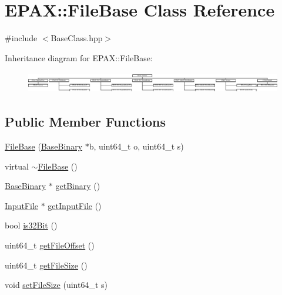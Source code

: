 \hypertarget{class_e_p_a_x_1_1_file_base}{\section{\-E\-P\-A\-X\-:\-:\-File\-Base \-Class \-Reference}
\label{class_e_p_a_x_1_1_file_base}
}


{\ttfamily \#include $<$\-Base\-Class.\-hpp$>$}

\-Inheritance diagram for \-E\-P\-A\-X\-:\-:\-File\-Base\-:\begin{figure}[H]
\begin{center}
\leavevmode
\includegraphics[height=0.952381cm]{class_e_p_a_x_1_1_file_base}
\end{center}
\end{figure}
\subsection*{\-Public \-Member \-Functions}
\begin{DoxyCompactItemize}
\item 
\hyperlink{class_e_p_a_x_1_1_file_base_a9f38ebc8164735bee43367806d76630d}{\-File\-Base} (\hyperlink{class_e_p_a_x_1_1_base_binary}{\-Base\-Binary} $\ast$b, uint64\-\_\-t o, uint64\-\_\-t s)
\item 
virtual \hyperlink{class_e_p_a_x_1_1_file_base_abf99ce91ed574b549d53a1ba43f931ba}{$\sim$\-File\-Base} ()
\item 
\hyperlink{class_e_p_a_x_1_1_base_binary}{\-Base\-Binary} $\ast$ \hyperlink{class_e_p_a_x_1_1_file_base_a2b31d9b96a82c8702aa2e20017039fd4}{get\-Binary} ()
\item 
\hyperlink{class_e_p_a_x_1_1_input_file}{\-Input\-File} $\ast$ \hyperlink{class_e_p_a_x_1_1_file_base_a996b93e64d317be72461c20089a1e91a}{get\-Input\-File} ()
\item 
bool \hyperlink{class_e_p_a_x_1_1_file_base_ab5c2b2dfb21a45a07121d3c0f7942e8b}{is32\-Bit} ()
\item 
uint64\-\_\-t \hyperlink{class_e_p_a_x_1_1_file_base_a779f2254eef1279f52f372e18bfb75f7}{get\-File\-Offset} ()
\item 
uint64\-\_\-t \hyperlink{class_e_p_a_x_1_1_file_base_a41637ea5355a70fee2467f279964e064}{get\-File\-Size} ()
\item 
void \hyperlink{class_e_p_a_x_1_1_file_base_a31b7e5375af339e1bbe998824bfd62f8}{set\-File\-Size} (uint64\-\_\-t s)
\end{DoxyCompactItemize}


